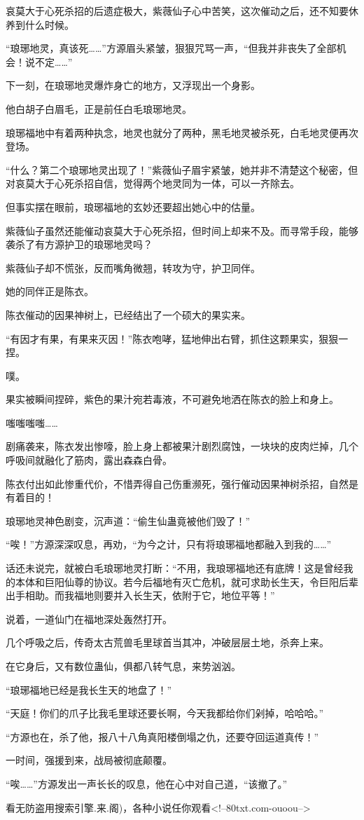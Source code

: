 \begin{this_body}
哀莫大于心死杀招的后遗症极大，紫薇仙子心中苦笑，这次催动之后，还不知要休养到什么时候。

“琅琊地灵，真该死……”方源眉头紧皱，狠狠咒骂一声，“但我并非丧失了全部机会！说不定……”

下一刻，在琅琊地灵爆炸身亡的地方，又浮现出一个身影。

他白胡子白眉毛，正是前任白毛琅琊地灵。

琅琊福地中有着两种执念，地灵也就分了两种，黑毛地灵被杀死，白毛地灵便再次登场。

“什么？第二个琅琊地灵出现了！”紫薇仙子眉宇紧皱，她并非不清楚这个秘密，但对哀莫大于心死杀招自信，觉得两个地灵同为一体，可以一齐除去。

但事实摆在眼前，琅琊福地的玄妙还要超出她心中的估量。

紫薇仙子虽然还能催动哀莫大于心死杀招，但时间上却来不及。而寻常手段，能够袭杀了有方源护卫的琅琊地灵吗？

紫薇仙子却不慌张，反而嘴角微翘，转攻为守，护卫同伴。

她的同伴正是陈衣。

陈衣催动的因果神树上，已经结出了一个硕大的果实来。

“有因才有果，有果来灭因！”陈衣咆哮，猛地伸出右臂，抓住这颗果实，狠狠一捏。

噗。

果实被瞬间捏碎，紫色的果汁宛若毒液，不可避免地洒在陈衣的脸上和身上。

嗤嗤嗤嗤……

剧痛袭来，陈衣发出惨嚎，脸上身上都被果汁剧烈腐蚀，一块块的皮肉烂掉，几个呼吸间就融化了筋肉，露出森森白骨。

陈衣付出如此惨重代价，不惜弄得自己伤重濒死，强行催动因果神树杀招，自然是有着目的！

琅琊地灵神色剧变，沉声道：“偷生仙蛊竟被他们毁了！”

“唉！”方源深深叹息，再劝，“为今之计，只有将琅琊福地都融入到我的……”

话还未说完，就被白毛琅琊地灵打断：“不用，我琅琊福地还有底牌！这是曾经我的本体和巨阳仙尊的协议。若今后福地有灭亡危机，就可求助长生天，令巨阳后辈出手相助。而我福地则要并入长生天，依附于它，地位平等！”

说着，一道仙门在福地深处轰然打开。

几个呼吸之后，传奇太古荒兽毛里球首当其冲，冲破层层土地，杀奔上来。

在它身后，又有数位蛊仙，俱都八转气息，来势汹汹。

“琅琊福地已经是我长生天的地盘了！”

“天庭！你们的爪子比我毛里球还要长啊，今天我都给你们剁掉，哈哈哈。”

“方源也在，杀了他，报八十八角真阳楼倒塌之仇，还要夺回运道真传！”

一时间，强援到来，战局被彻底颠覆。

“唉……”方源发出一声长长的叹息，他在心中对自己道，“该撤了。”

看无防盗用搜索引擎.来.阁)，各种小说任你观看<!--80txt.com-ouoou-->

\end{this_body}

